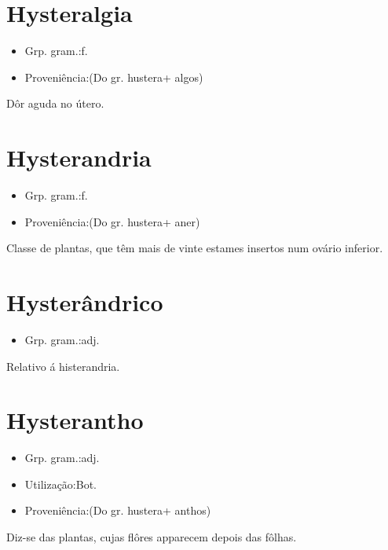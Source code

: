 \documentclass{article}
\begin{document}
\section{Hysteralgia}
\begin{itemize}
\item {Grp. gram.:f.}
\end{itemize}
\begin{itemize}
\item {Proveniência:(Do gr. \textunderscore hustera\textunderscore  + \textunderscore algos\textunderscore )}
\end{itemize}
Dôr aguda no útero.
\section{Hysterandria}
\begin{itemize}
\item {Grp. gram.:f.}
\end{itemize}
\begin{itemize}
\item {Proveniência:(Do gr. \textunderscore hustera\textunderscore  + \textunderscore aner\textunderscore )}
\end{itemize}
Classe de plantas, que têm mais de vinte estames insertos num ovário inferior.
\section{Hysterândrico}
\begin{itemize}
\item {Grp. gram.:adj.}
\end{itemize}
Relativo á histerandria.
\section{Hysterantho}
\begin{itemize}
\item {Grp. gram.:adj.}
\end{itemize}
\begin{itemize}
\item {Utilização:Bot.}
\end{itemize}
\begin{itemize}
\item {Proveniência:(Do gr. \textunderscore hustera\textunderscore  + \textunderscore anthos\textunderscore )}
\end{itemize}
Diz-se das plantas, cujas flôres apparecem depois das fôlhas.
\end{document}
